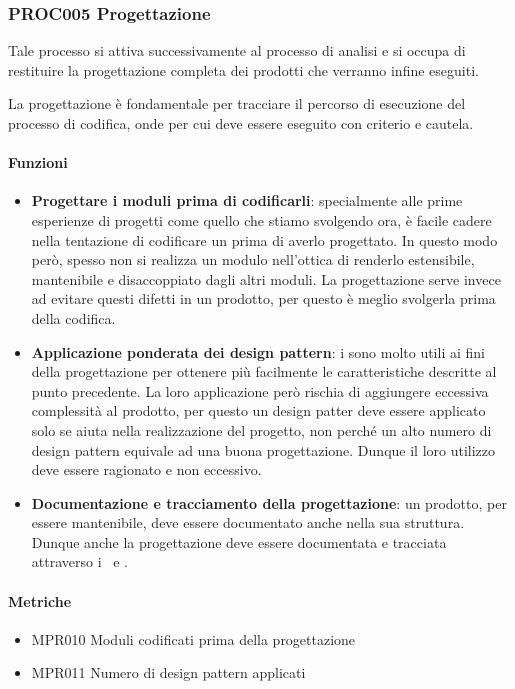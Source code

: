     \subsubsection{PROC005 Progettazione}\label{proc005}
    Tale processo si attiva successivamente al processo di analisi e si occupa di restituire la progettazione completa dei prodotti che verranno infine eseguiti. \par
    La progettazione è fondamentale per tracciare il percorso di esecuzione del processo di codifica, onde per cui deve essere eseguito con criterio e cautela.

        \paragraph*{Funzioni}
        \begin{itemize}
            \item \textbf{Progettare i moduli prima di codificarli}: specialmente alle prime esperienze di progetti come quello che stiamo svolgendo ora, è facile cadere nella tentazione di codificare un  prima di averlo progettato. In questo modo però, spesso non si realizza un modulo nell'ottica di renderlo estensibile, mantenibile e disaccoppiato dagli altri moduli. La progettazione serve invece ad evitare questi difetti in un prodotto, per questo è meglio svolgerla prima della codifica.
            \item \textbf{Applicazione ponderata dei design pattern}: i  sono molto utili ai fini della progettazione per ottenere più facilmente le caratteristiche descritte al punto precedente. La loro applicazione però rischia di aggiungere eccessiva complessità al prodotto, per questo un design patter deve essere applicato solo se aiuta nella realizzazione del progetto, non perché un alto numero di design pattern equivale ad una buona progettazione. Dunque il loro utilizzo deve essere ragionato e non eccessivo.
            \item \textbf{Documentazione e tracciamento della progettazione}: un prodotto, per essere mantenibile, deve essere documentato anche nella sua struttura. Dunque anche la progettazione deve essere documentata e tracciata attraverso i \MUd\ e \MSd.
        \end{itemize}

        \paragraph*{Metriche}
        \begin{itemize}
            \item MPR010 Moduli codificati prima della progettazione
            \item MPR011 Numero di design pattern applicati
        \end{itemize}

